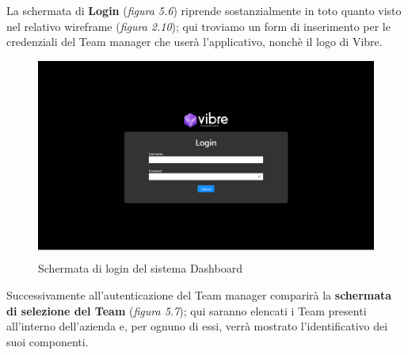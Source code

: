 \noindent La schermata di {\bf Login} (\emph{figura 5.6}) riprende sostanzialmente in toto quanto visto nel relativo wireframe (\emph{figura 2.10}); qui troviamo un form di inserimento per le credenziali del Team manager che userà l'applicativo, nonchè il logo di Vibre.
\vspace{8mm}
\begin{figure}[H]
    \centering
    \includegraphics[width=1.0\textwidth]{img/dashboard_login_screenshot.png}
    \caption{Schermata di login del sistema Dashboard}
\end{figure}
\vspace{5mm}
\noindent Successivamente all'autenticazione del Team manager comparirà la {\bf schermata di selezione del Team} (\emph{figura 5.7}); qui saranno elencati i Team presenti all'interno dell'azienda e, per ognuno di essi, verrà mostrato l'identificativo dei suoi componenti.\newline

\vspace{30mm}

